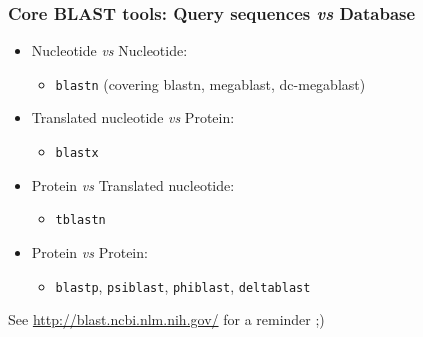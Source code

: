 \begin{frame}
  \frametitle{Core BLAST tools: Query sequences \textit{vs} Database}
  \begin{itemize}
    \item Nucleotide \textit{vs} Nucleotide:
    \begin{itemize}
      \item \texttt{blastn} (covering blastn, megablast, dc-megablast)
    \end{itemize}
    \item Translated nucleotide \textit{vs} Protein:
    \begin{itemize}
      \item \texttt{blastx}
    \end{itemize}
    \item Protein \textit{vs} Translated nucleotide:
    \begin{itemize}
      \item \texttt{tblastn}
    \end{itemize}
    \item Protein \textit{vs} Protein:
    \begin{itemize}
      \item \texttt{blastp}, \texttt{psiblast}, \texttt{phiblast}, \texttt{deltablast}
    \end{itemize}
  \end{itemize}
  See \url{http://blast.ncbi.nlm.nih.gov/} for a reminder ;)
\end{frame}
